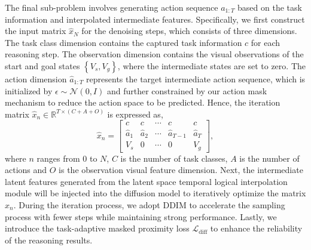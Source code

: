 The final sub-problem involves generating action sequence $a_{1:T}$ based on the task information and interpolated intermediate features. 
Specifically, we first construct the input matrix $\hat{x}_N$ for the denoising steps, which consists of three dimensions. 
The task class dimension contains the captured task information $c$ for each reasoning step.
The observation dimension contains the visual observations of the start and goal states $\left\{ {V_s, V_g} \right\}$, where the intermediate states are set to zero. 
The action dimension $\hat{a}_{1:T}$ represents the target intermediate action sequence, which is initialized by $\epsilon \sim \mathcal{N}(0, I)$ and further constrained by our action mask mechanism to reduce the action space to be predicted.
Hence, the iteration matrix $\hat{x}_n \in \mathbb{R}^{ T \times (C+A+O)  }$ is expressed as, 
\begin{equation}
    \hat{x}_n = \begin{bmatrix}  
        c & c & \cdots & c & c \\  
        \hat{a}_1 & \hat{a}_2 & \cdots & \hat{a}_{T-1} & \hat{a}_T \\  
        V_s & 0 & \cdots & 0 & V_g
    \end{bmatrix},
\end{equation}
where $n$ ranges from 0 to $N$, $C$ is the number of task classes, $A$ is the number of actions and $O$ is the observation visual feature dimension. Next, the intermediate latent features generated from the latent space temporal logical interpolation module will be injected into the diffusion model to iteratively optimize the matrix $\hat{x}_n$. 
During the iteration process, we adopt DDIM to accelerate the sampling process with fewer steps while maintaining strong performance. 
Lastly, we introduce the task-adaptive masked proximity loss $\mathcal{L}_{\mathrm{diff}}$ to enhance the reliability of the reasoning results.


